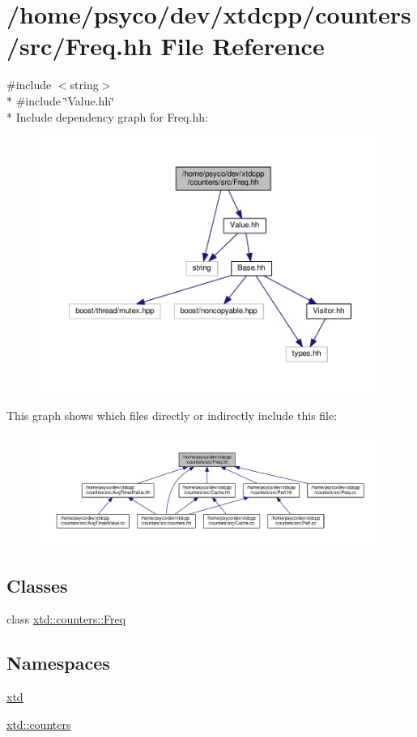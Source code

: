 \hypertarget{Freq_8hh}{}\section{/home/psyco/dev/xtdcpp/counters/src/\+Freq.hh File Reference}
\label{Freq_8hh}
{\ttfamily \#include $<$string$>$}\\*
{\ttfamily \#include \char`\"{}Value.\+hh\char`\"{}}\\*
Include dependency graph for Freq.\+hh\+:
\nopagebreak
\begin{figure}[H]
\begin{center}
\leavevmode
\includegraphics[width=350pt]{Freq_8hh__incl}
\end{center}
\end{figure}
This graph shows which files directly or indirectly include this file\+:
\nopagebreak
\begin{figure}[H]
\begin{center}
\leavevmode
\includegraphics[width=350pt]{Freq_8hh__dep__incl}
\end{center}
\end{figure}
\subsection*{Classes}
\begin{DoxyCompactItemize}
\item 
class \hyperlink{classxtd_1_1counters_1_1Freq}{xtd\+::counters\+::\+Freq}
\end{DoxyCompactItemize}
\subsection*{Namespaces}
\begin{DoxyCompactItemize}
\item 
 \hyperlink{namespacextd}{xtd}
\item 
 \hyperlink{namespacextd_1_1counters}{xtd\+::counters}
\end{DoxyCompactItemize}

